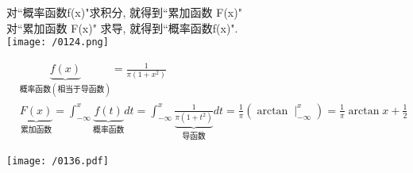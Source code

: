 \documentclass[UTF8]{ctexart}
\begin{document}
对``概率函数f(x)"求积分, 就得到``累加函数 F(x)" \\
对``累加函数 F(x)" 求导, 就得到``概率函数f(x)". \\

\texttt{[image: /0124.png]} \\



\begin{myEnvSample}
\begin{align*}  %
	&\underset{\text{概率函数}\left( \text{相当于导函数} \right)}{\underbrace{f\left( x \right) }}=\frac{1}{\pi \left( 1+x^2 \right)}\\
&\underset{\text{累加函数}}{\underbrace{F\left( x \right) }}
=\int_{-\infty}^x{\underset{\text{概率函数}}{\underbrace{f\left( t \right) }}}dt
=\int_{-\infty}^x{\underset{\text{导函数}}{\underbrace{\frac{1}{\pi \left( 1+t^2 \right)}}}}dt
=\frac{1}{\pi}\left( \arctan \mid_{-\infty}^{x} \right) 
=\frac{1}{\pi}\arctan x+\frac{1}{2}
\end{align*}

\texttt{[image: /0136.pdf]}
\end{myEnvSample}
\vspace{1em} 
\end{document}
